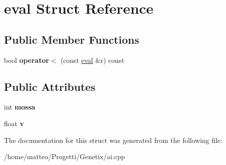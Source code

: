 \hypertarget{structeval}{}\section{eval Struct Reference}
\label{structeval}
\subsection*{Public Member Functions}
\begin{DoxyCompactItemize}
\item 
\mbox{\label{structeval_a6affabc87a0e79c4678f4c41da7a8550}} 
bool {\bfseries operator$<$} (const \hyperlink{structeval}{eval} \&r) const
\end{DoxyCompactItemize}
\subsection*{Public Attributes}
\begin{DoxyCompactItemize}
\item 
\mbox{\label{structeval_a906e05efee4a029df6d3109bf639082f}} 
int {\bfseries mossa}
\item 
\mbox{\label{structeval_a992766ff43dde550e1854cc607278560}} 
float {\bfseries v}
\end{DoxyCompactItemize}


The documentation for this struct was generated from the following file\+:\begin{DoxyCompactItemize}
\item 
/home/matteo/\+Progetti/\+Genetix/ai.\+cpp\end{DoxyCompactItemize}
